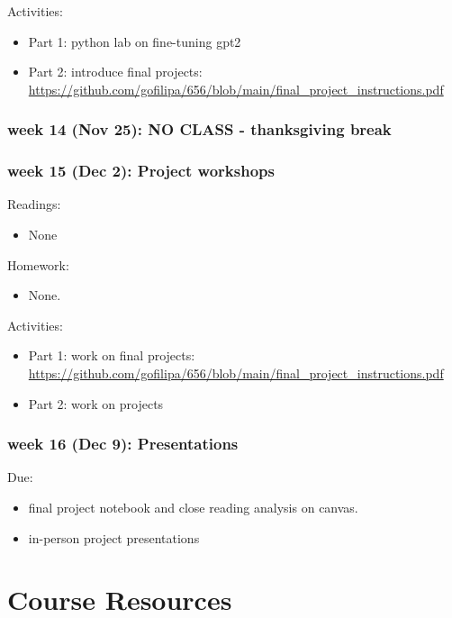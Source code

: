 \documentclass[12pt]{article}
\begin{document}
Activities:
\begin{itemize}
\item Part 1: python lab on fine-tuning gpt2
\item Part 2: introduce final projects:
\url{https://github.com/gofilipa/656/blob/main/final\_project\_instructions.pdf}
\end{itemize}

\subsubsection*{week 14 (Nov 25): NO CLASS - thanksgiving break}
\label{sec:orgafcd5ed}
\subsubsection*{week 15 (Dec 2): Project workshops}
\label{sec:orgf88a475}
Readings:
\begin{itemize}
\item None
\end{itemize}

Homework:
\begin{itemize}
\item None.
\end{itemize}

Activities:
\begin{itemize}
\item Part 1: work on final projects:
\url{https://github.com/gofilipa/656/blob/main/final\_project\_instructions.pdf}
\item Part 2: work on projects
\end{itemize}
\subsubsection*{week 16 (Dec 9): Presentations}
\label{sec:org46b1bb9}
Due:
\begin{itemize}
\item final project notebook and close reading analysis on canvas.
\item in-person project presentations
\end{itemize}

\section*{Course Resources}
\label{sec:orgefb17f9}
\end{document}
